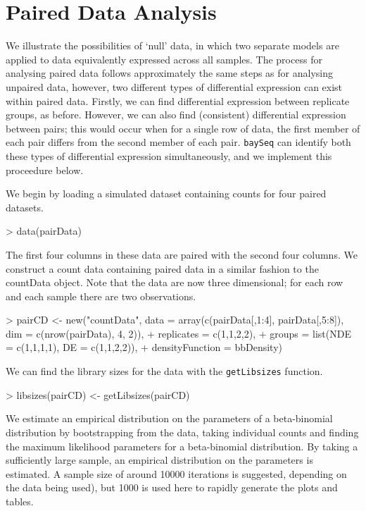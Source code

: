 \documentclass[a4paper]{article}
\begin{document}
\section{Paired Data Analysis}

We illustrate the possibilities of `null' data, in which two separate models are applied to data equivalently expressed across all samples. The process for analysing paired data follows approximately the same steps as for analysing unpaired data, however, two different types of differential expression can exist within paired data. Firstly, we can find differential expression between replicate groups, as before. However, we can also find (consistent) differential expression between pairs; this would occur when for a single row of data, the first member of each pair differs from the second member of each pair. \verb'baySeq' can identify both these types of differential expression simultaneously, and we implement this proceedure below.

We begin by loading a simulated dataset containing counts for four paired datasets.
\begin{Schunk}
\begin{Sinput}
>   data(pairData)  
\end{Sinput}
\end{Schunk}

The first four columns in these data are paired with the second four columns. We construct a count data containing paired data in a similar fashion to the countData object. Note that the data are now three dimensional; for each row and each sample there are two observations.
\begin{Schunk}
\begin{Sinput}
> pairCD <- new("countData", data = array(c(pairData[,1:4], pairData[,5:8]), dim = c(nrow(pairData), 4, 2)),
+                  replicates = c(1,1,2,2),
+                  groups = list(NDE = c(1,1,1,1), DE = c(1,1,2,2)),
+               densityFunction = bbDensity)
\end{Sinput}
\end{Schunk}

We can find the library sizes for the data with the \verb'getLibsizes' function.
\begin{Schunk}
\begin{Sinput}
> libsizes(pairCD) <- getLibsizes(pairCD)
\end{Sinput}
\end{Schunk}

We estimate an empirical distribution on the parameters of a beta-binomial distribution by bootstrapping from the data, taking individual counts and finding the maximum likelihood parameters for a beta-binomial distribution. By taking a sufficiently large sample, an empirical distribution on the parameters is estimated. A sample size of around 10000 iterations is suggested, depending on the data being used), but 1000 is used here to rapidly generate the plots and tables.
\end{document}
